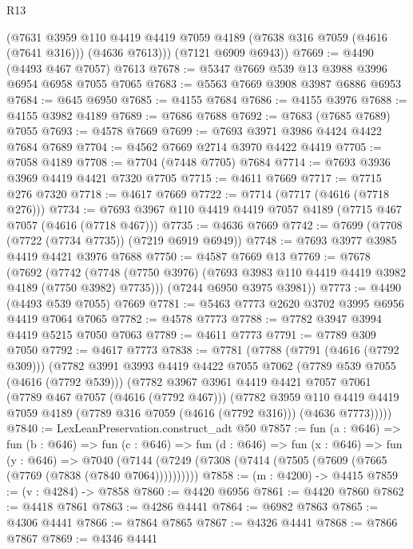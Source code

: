 \begin{lexlean}{R13}
\begin{coremodule}
        (@7631
          @3959
          @110
          @4419
          @4419
          @7059
          @4189
          (@7638 @316 @7059 (@4616 (@7641 @316)))
          (@4636 @7613)))
      (@7121 @6909 @6943))
@7669 := @4490 (@4493 @467 @7057) @7613
@7678 := @5347 @7669 @539 @13 @3988 @3996 @6954 @6958 @7055 @7065
@7683 := @5563 @7669 @3908 @3987 @6886 @6953
@7684 := @645 @6950
@7685 := @4155 @7684
@7686 := @4155 @3976
@7688 := @4155 @3982 @4189
@7689 := @7686 @7688
@7692 := @7683 (@7685 @7689) @7055
@7693 := @4578 @7669
@7699 := @7693 @3971 @3986 @4424 @4422 @7684 @7689
@7704 := @4562 @7669 @2714 @3970 @4422 @4419
@7705 := @7058 @4189
@7708 := @7704 (@7448 @7705) @7684
@7714 := @7693 @3936 @3969 @4419 @4421 @7320 @7705
@7715 := @4611 @7669
@7717 := @7715 @276 @7320
@7718 := @4617 @7669
@7722 := @7714 (@7717 (@4616 (@7718 @276)))
@7734 := @7693 @3967 @110 @4419 @4419 @7057 @4189 (@7715 @467 @7057 (@4616 (@7718 @467)))
@7735 := @4636 @7669
@7742 := @7699 (@7708 (@7722 (@7734 @7735)) (@7219 @6919 @6949))
@7748 := @7693 @3977 @3985 @4419 @4421 @3976 @7688
@7750 := @4587 @7669 @13
@7769 := @7678
    (@7692
      (@7742 (@7748 (@7750 @3976) (@7693 @3983 @110 @4419 @4419 @3982 @4189 (@7750 @3982) @7735)))
      (@7244 @6950 @3975 @3981))
@7773 := @4490 (@4493 @539 @7055) @7669
@7781 := @5463 @7773 @2620 @3702 @3995 @6956 @4419 @7064 @7065
@7782 := @4578 @7773
@7788 := @7782 @3947 @3994 @4419 @5215 @7050 @7063
@7789 := @4611 @7773
@7791 := @7789 @309 @7050
@7792 := @4617 @7773
@7838 := @7781
    (@7788
      (@7791 (@4616 (@7792 @309)))
      (@7782
        @3991
        @3993
        @4419
        @4422
        @7055
        @7062
        (@7789 @539 @7055 (@4616 (@7792 @539)))
        (@7782
          @3967
          @3961
          @4419
          @4421
          @7057
          @7061
          (@7789 @467 @7057 (@4616 (@7792 @467)))
          (@7782
            @3959
            @110
            @4419
            @4419
            @7059
            @4189
            (@7789 @316 @7059 (@4616 (@7792 @316)))
            (@4636 @7773)))))
@7840 := LexLeanPreservation.construct_adt @50
@7857 := fun (a : @646) =>
  fun (b : @646) =>
  fun (c : @646) =>
  fun (d : @646) =>
  fun (x : @646) =>
  fun (y : @646) =>
  @7040 (@7144 (@7249 (@7308 (@7414 (@7505 (@7609 (@7665 (@7769 (@7838 (@7840 @7064))))))))))
@7858 := (m : @4200) -> @4415
@7859 := (v : @4284) -> @7858
@7860 := @4420 @6956
@7861 := @4420 @7860
@7862 := @4418 @7861
@7863 := @4286 @4441
@7864 := @6982 @7863
@7865 := @4306 @4441
@7866 := @7864 @7865
@7867 := @4326 @4441
@7868 := @7866 @7867
@7869 := @4346 @4441

\end{coremodule}
\end{lexlean}
